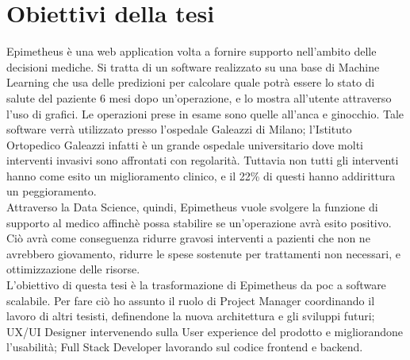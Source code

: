 \section{Obiettivi della tesi}
Epimetheus è una web application volta a fornire supporto nell'ambito delle decisioni mediche. Si tratta di un software realizzato su una base di Machine Learning che usa delle  predizioni per calcolare quale potrà essere lo stato di salute del paziente 6 mesi dopo un'operazione, e lo mostra all'utente attraverso l'uso di grafici. Le operazioni prese in esame sono quelle all'anca e ginocchio. Tale software verrà utilizzato presso l'ospedale Galeazzi di Milano; l'Istituto Ortopedico Galeazzi infatti è un grande ospedale universitario dove molti interventi invasivi sono affrontati con regolarità. Tuttavia non tutti gli interventi hanno come esito un miglioramento clinico, e il 22\% di questi hanno addirittura un peggioramento. \\
Attraverso la Data Science, quindi, Epimetheus vuole svolgere la funzione di supporto al medico affinchè possa stabilire se un'operazione avrà esito positivo. Ciò avrà come conseguenza ridurre gravosi interventi a pazienti che non ne avrebbero giovamento, ridurre le spese sostenute per trattamenti non necessari, e ottimizzazione delle risorse. \\

L'obiettivo di questa tesi è la trasformazione di Epimetheus da \gls{poc} a software scalabile. Per fare ciò ho assunto il ruolo di Project Manager coordinando il lavoro di altri tesisti, definendone la nuova architettura e gli sviluppi futuri; UX/UI Designer intervenendo sulla User experience del prodotto e migliorandone l'usabilità; Full Stack Developer lavorando sul codice frontend e backend.


